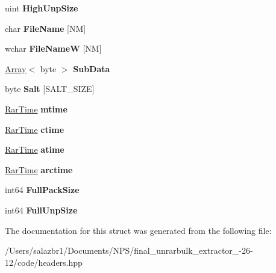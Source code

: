 \begin{DoxyCompactItemize}
\item 
\hypertarget{struct_file_header_abc7511a308607e4ca0a43952ce034fea}{uint {\bfseries High\-Unp\-Size}}\label{struct_file_header_abc7511a308607e4ca0a43952ce034fea}

\item 
\hypertarget{struct_file_header_a55f1028c28e452debab78582df25d1cd}{char {\bfseries File\-Name} \mbox{[}N\-M\mbox{]}}\label{struct_file_header_a55f1028c28e452debab78582df25d1cd}

\item 
\hypertarget{struct_file_header_a76786fbb1426d57adbf9642ad69a70ca}{wchar {\bfseries File\-Name\-W} \mbox{[}N\-M\mbox{]}}\label{struct_file_header_a76786fbb1426d57adbf9642ad69a70ca}

\item 
\hypertarget{struct_file_header_ab233d66624d5d2599afa67e7da75f648}{\hyperlink{class_array}{Array}$<$ byte $>$ {\bfseries Sub\-Data}}\label{struct_file_header_ab233d66624d5d2599afa67e7da75f648}

\item 
\hypertarget{struct_file_header_a9e543079bb0dbadb4b82c0ee85a4f5ba}{byte {\bfseries Salt} \mbox{[}S\-A\-L\-T\-\_\-\-S\-I\-Z\-E\mbox{]}}\label{struct_file_header_a9e543079bb0dbadb4b82c0ee85a4f5ba}

\item 
\hypertarget{struct_file_header_ac3832136560d3f982141f815984f637c}{\hyperlink{class_rar_time}{Rar\-Time} {\bfseries mtime}}\label{struct_file_header_ac3832136560d3f982141f815984f637c}

\item 
\hypertarget{struct_file_header_a4a3e06349dce2d56db21c7625e54b351}{\hyperlink{class_rar_time}{Rar\-Time} {\bfseries ctime}}\label{struct_file_header_a4a3e06349dce2d56db21c7625e54b351}

\item 
\hypertarget{struct_file_header_a007f826e5e2500d116163fdd5053858d}{\hyperlink{class_rar_time}{Rar\-Time} {\bfseries atime}}\label{struct_file_header_a007f826e5e2500d116163fdd5053858d}

\item 
\hypertarget{struct_file_header_ad100aeacb58dea2c1704fdee6f15bf5e}{\hyperlink{class_rar_time}{Rar\-Time} {\bfseries arctime}}\label{struct_file_header_ad100aeacb58dea2c1704fdee6f15bf5e}

\item 
\hypertarget{struct_file_header_a8e9137ea03d6351428f869df8be8d5f7}{int64 {\bfseries Full\-Pack\-Size}}\label{struct_file_header_a8e9137ea03d6351428f869df8be8d5f7}

\item 
\hypertarget{struct_file_header_a61d5b82cef4c18789734ea048206c064}{int64 {\bfseries Full\-Unp\-Size}}\label{struct_file_header_a61d5b82cef4c18789734ea048206c064}

\end{DoxyCompactItemize}


The documentation for this struct was generated from the following file\-:\begin{DoxyCompactItemize}
\item 
/\-Users/salazbr1/\-Documents/\-N\-P\-S/final\-\_\-unrarbulk\-\_\-extractor\-\_-\/26-\/12/code/headers.\-hpp\end{DoxyCompactItemize}
